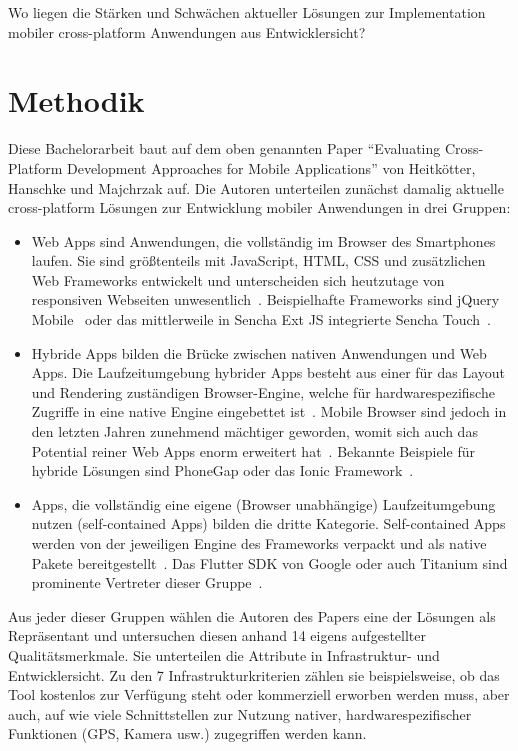 Wo liegen die Stärken und Schwächen aktueller Lösungen zur Implementation mobiler cross-platform Anwendungen aus Entwicklersicht?

\section*{Methodik}

Diese Bachelorarbeit baut auf dem oben genannten Paper “Evaluating Cross-Platform Development Approaches for Mobile Applications” von Heitkötter, Hanschke und Majchrzak auf. Die Autoren unterteilen zunächst damalig aktuelle cross-platform Lösungen zur Entwicklung mobiler Anwendungen in drei Gruppen:
\begin{itemize}
    \item Web Apps sind Anwendungen, die vollständig im Browser des Smartphones laufen. Sie sind größtenteils mit JavaScript, HTML, CSS und zusätzlichen Web Frameworks entwickelt und unterscheiden sich heutzutage von responsiven Webseiten unwesentlich~\cite{eva12}.
    Beispielhafte Frameworks sind jQuery Mobile~\cite{jquery} oder das mittlerweile in Sencha Ext JS integrierte Sencha Touch~\cite{sencha}.
    
    \item Hybride Apps bilden die Brücke zwischen nativen Anwendungen und Web Apps. Die Laufzeitumgebung hybrider Apps besteht aus einer für das Layout und Rendering zuständigen Browser-Engine, welche für hardwarespezifische Zugriffe in eine native Engine eingebettet ist~\cite{eva12}.
    Mobile Browser sind jedoch in den letzten Jahren zunehmend mächtiger geworden, womit sich auch das Potential reiner Web Apps enorm erweitert hat~\cite{gdev}.
    Bekannte Beispiele für hybride Lösungen sind PhoneGap oder das Ionic Framework~\cite{phonegap,ionic}.
    
    \item Apps, die vollständig eine eigene (Browser unabhängige) Laufzeitumgebung nutzen (self-contained Apps) bilden die dritte Kategorie. Self-contained Apps werden von der jeweiligen Engine des Frameworks verpackt und als native Pakete bereitgestellt~\cite{eva12}. Das Flutter SDK von Google oder auch Titanium sind prominente Vertreter dieser Gruppe~\cite{flutter,tita}.
    
\end{itemize}
Aus jeder dieser Gruppen wählen die Autoren des Papers eine der Lösungen als Repräsentant und untersuchen diesen anhand 14 eigens aufgestellter Qualitätsmerkmale. Sie unterteilen die Attribute in Infrastruktur- und Entwicklersicht. Zu den 7 Infrastrukturkriterien zählen sie beispielsweise, ob das Tool kostenlos zur Verfügung steht oder kommerziell erworben werden muss, aber auch, auf wie viele Schnittstellen zur Nutzung nativer, hardwarespezifischer Funktionen (GPS, Kamera usw.) zugegriffen werden kann.
